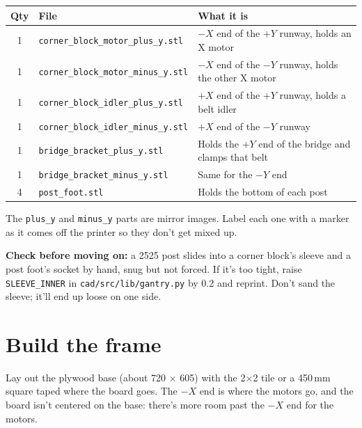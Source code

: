 \documentclass[10pt]{article}
\newcommand{\mm}{\,mm}
\newcommand{\file}[1]{\texttt{#1}}
\newcommand{\gate}[1]{\par\smallskip\noindent\colorbox{okgreen!10}{\parbox{\dimexpr\linewidth-2\fboxsep}{\textcolor{okgreen}{\textbf{Check before moving on:}} #1}}\par\smallskip}
\begin{document}
\begin{tabularx}{\textwidth}{c l L}
\toprule
Qty & File & What it is \\
 & \file{corner\_block\_motor\_plus\_y.stl} & $-X$ end of the $+Y$ runway, holds an X motor \\
1 & \file{corner\_block\_motor\_minus\_y.stl} & $-X$ end of the $-Y$ runway, holds the other X motor \\
1 & \file{corner\_block\_idler\_plus\_y.stl} & $+X$ end of the $+Y$ runway, holds a belt idler \\
1 & \file{corner\_block\_idler\_minus\_y.stl} & $+X$ end of the $-Y$ runway \\
1 & \file{bridge\_bracket\_plus\_y.stl} & Holds the $+Y$ end of the bridge and clamps that belt \\
1 & \file{bridge\_bracket\_minus\_y.stl} & Same for the $-Y$ end \\
4 & \file{post\_foot.stl} & Holds the bottom of each post \\
\bottomrule
\end{tabularx}

The \file{plus\_y} and \file{minus\_y} parts are mirror images. Label each one with a marker as it
comes off the printer so they don't get mixed up.

\gate{a 2525 post slides into a corner block's sleeve and a post foot's socket by hand, snug but
not forced. If it's too tight, raise \texttt{SLEEVE\_INNER} in \file{cad/src/lib/gantry.py} by
0.2 and reprint. Don't sand the sleeve; it'll end up loose on one side.}

\section{Build the frame}

Lay out the plywood base (about 720 $\times$ 605) with the 2$\times$2 tile or a 450\mm{} square
taped where the board goes. The $-X$ end is where the motors go, and the board isn't centered
on the base: there's more room past the $-X$ end for the motors.
\end{document}
